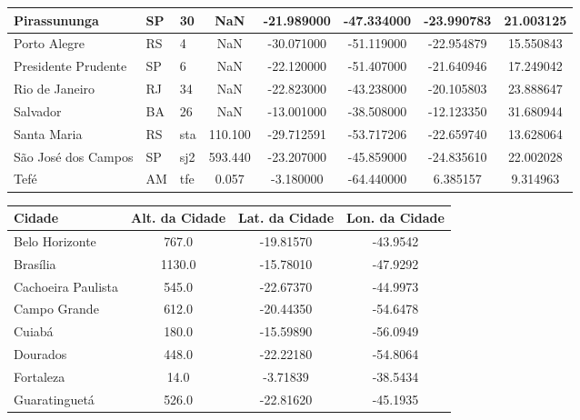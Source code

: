 \begin{table}
\begin{tabular}{|l|l|l|c|c|c|c|c|}
Pirassununga        &    SP &                    30 &       NaN & -21.989000 & -47.334000 &    -23.990783 &      21.003125   \\ \hline
Porto Alegre        &    RS &                     4 &       NaN & -30.071000 & -51.119000 &    -22.954879 &      15.550843   \\ \hline
Presidente Prudente &    SP &                     6 &       NaN & -22.120000 & -51.407000 &    -21.640946 &      17.249042   \\ \hline
Rio de Janeiro      &    RJ &                    34 &       NaN & -22.823000 & -43.238000 &    -20.105803 &      23.888647   \\ \hline
Salvador            &    BA &                    26 &       NaN & -13.001000 & -38.508000 &    -12.123350 &      31.680944   \\ \hline
Santa Maria         &    RS &                   sta &   110.100 & -29.712591 & -53.717206 &    -22.659740 &      13.628064   \\ \hline
São José dos Campos &    SP &                   sj2 &   593.440 & -23.207000 & -45.859000 &    -24.835610 &      22.002028   \\ \hline
Tefé                &    AM &                   tfe &     0.057 &  -3.180000 & -64.440000 &      6.385157 &       9.314963   \\ \hline
\end{tabular}\label{tab:stations}
\begin{tabular}{|l|c|c|c|}
\hline
Cidade              &   Alt. da Cidade &  Lat. da Cidade &  Lon. da Cidade \\ \hline
Belo Horizonte      &            767.0 &       -19.81570 &        -43.9542 \\ \hline
Brasília            &           1130.0 &       -15.78010 &        -47.9292 \\ \hline
Cachoeira Paulista  &            545.0 &       -22.67370 &        -44.9973 \\ \hline
Campo Grande        &            612.0 &       -20.44350 &        -54.6478 \\ \hline
Cuiabá              &            180.0 &       -15.59890 &        -56.0949 \\ \hline
Dourados            &            448.0 &       -22.22180 &        -54.8064 \\ \hline
Fortaleza           &             14.0 &        -3.71839 &        -38.5434 \\ \hline
Guaratinguetá       &            526.0 &       -22.81620 &        -45.1935 \\ \hline

\end{tabular}
\end{table}
